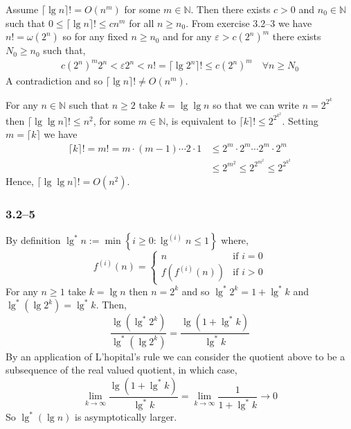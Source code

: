Assume $\lceil\lg n\rceil!=O(n^{m})$ for some $m\in\mathbb{N}$. Then there exists $c>0$ and $n_{0}\in\mathbb{N}$ such that $0\leq \lceil\lg n\rceil!\leq cn^{m}$ for all $n\geq n_{0}$. From exercise 3.2--3 we have $n!=\omega(2^{n})$ so for any fixed $n\geq n_{0}$ and for any $\varepsilon>c(2^{n})^{m}$ there exists $N_{0}\geq n_{0}$ such that,
\begin{equation*}
	\begin{aligned}
		c(2^{n})^{m}2^{n} < \varepsilon 2^{n} < n! = \lceil\lg 2^{n}\rceil! \leq c (2^{n})^{m}\quad\forall n\geq N_{0}
	\end{aligned}
\end{equation*}
A contradiction and so $\lceil\lg n\rceil!\neq O(n^{m})$.

For any $n\in\mathbb{N}$ such that $n\geq 2$ take $k=\lg\lg n$ so that we can write $n=2^{2^{k}}$ then $\lceil\lg\lg n\rceil!\leq n^{2}$, for some $m\in\mathbb{N}$, is equivalent to $\lceil k\rceil!\leq 2^{2^{k^{2}}}$. Setting $m=\lceil k\rceil$ we have
\begin{equation*}
	\begin{aligned}
		\lceil k\rceil! = m! = m\cdot(m-1)\cdots2\cdot1 &\leq 2^{m}\cdot2^{m}\cdots2^{m}\cdot2^{m}\\
		&\leq 2^{m^{2}} \leq 2^{2^{m^{2}}} \leq 2^{2^{k^{2}}}
	\end{aligned}
\end{equation*}
Hence, $\lceil\lg\lg n\rceil!=O(n^{2})$.

\subsubsection*{3.2--5}

By definition $\lg^{*}n:=\min\left\{i\geq 0\colon \lg^{(i)}n\leq 1\right\}$ where,
\begin{equation*}
	f^{(i)}(n) =
	\begin{cases}
		n& \text{if }i=0\\
		f(f^{(i)}(n))& \text{if }i>0
	\end{cases}
\end{equation*}
For any $n\geq 1$ take $k=\lg n$ then $n=2^{k}$ and so $\lg^{*}2^{k} = 1 + \lg^{*}k$ and $\lg^{*}(\lg 2^{k})=\lg^{*}k$. Then,
\begin{equation*}
	\frac{\lg(\lg^{*}2^{k})}{\lg^{*}(\lg 2^{k})} = \frac{\lg(1 + \lg^{*}k)}{\lg^{*}k}
\end{equation*}
By an application of L'hopital's rule we can consider the quotient above to be a subsequence of the real valued quotient, in which case,
\begin{equation*}
	\lim_{k\to\infty}\frac{\lg(1+\lg^{*}k)}{\lg^{*}k} = \lim_{k\to\infty}\frac{1}{1 + \lg^{*}k}\to 0
\end{equation*}
So $\lg^{*}(\lg n)$ is asymptotically larger.

